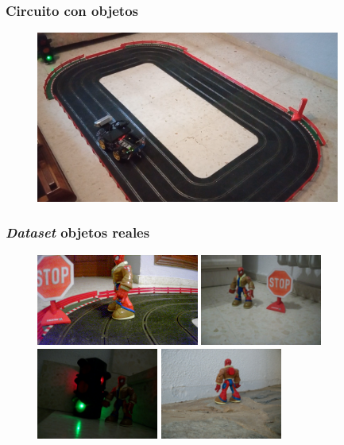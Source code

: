 \documentclass{beamer}
\begin{document}
\begin{frame}
	\frametitle{Circuito con objetos}
	\begin{figure}
		\centering
		\includegraphics[width=10cm]{figs/circuitwithobjects2}
	\end{figure}
\end{frame}

\begin{frame}
	\frametitle{\textit{Dataset} objetos reales}
	\begin{figure}
		\centering
		\includegraphics[height=3cm]{figs/datasetone}\hspace{0.5cm}
		\includegraphics[width=4cm]{figs/datasettwo}\hspace{0.5cm}\\
		\vspace{1cm}\includegraphics[width=4cm]{figs/datasetthree}\hspace{0.5cm}
		\includegraphics[width=4cm]{figs/datasetfour}
	\end{figure}
\end{frame}
\end{document}
